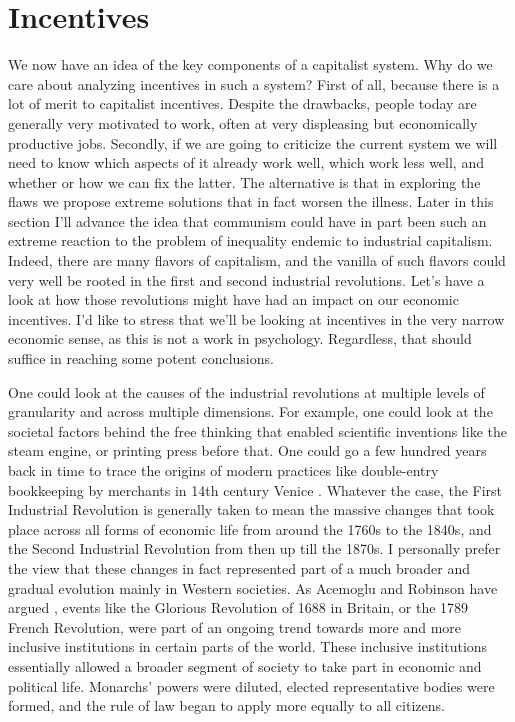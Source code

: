 \documentclass[12pt]{memoir}
\begin{document}
		\section{Incentives}
			We now have an idea of the key components of a capitalist system. Why do we care about analyzing incentives in such a system? First of all, because there is a lot of merit 
			to capitalist incentives. Despite the drawbacks, people today are generally very motivated to work, often at very displeasing but economically productive jobs. Secondly, if we are going to 
			criticize the current system we will need to know which aspects of it already work well, which work less well, and whether or how we can fix the latter. The alternative is that in exploring the flaws 
			we propose extreme solutions that in fact worsen the illness. Later in this section I'll advance the idea that communism could have in part been such an extreme reaction to the problem of inequality endemic 
			to industrial capitalism. Indeed, there are many flavors of capitalism, and the vanilla of such flavors could very well be rooted in the first and second industrial revolutions. Let's have a look at how those 
			revolutions might have had an impact on our economic incentives. I'd like to stress that we'll be looking at incentives in the very narrow economic sense, as this is not a work in psychology. Regardless, that should 
			suffice in reaching some potent conclusions.\
			
			One could look at the causes of the industrial revolutions at multiple levels of granularity and across multiple dimensions. For example, one could look at the societal factors behind the free thinking 
			that enabled scientific inventions like the steam engine, or printing press before that. One could go a few hundred years back in time to trace the origins of modern practices like double-entry 
			bookkeeping by merchants in 14th century Venice \cite{VeniceMerchants}. Whatever the case, the First Industrial Revolution is generally taken to mean the massive changes that took place
			across all forms of economic life from around the 1760s to the 1840s, and the Second Industrial Revolution from then up till the 1870s. I personally prefer the view that these changes 
			in fact represented part of a much broader and gradual evolution mainly in Western societies. As Acemoglu and Robinson have argued \cite{WhyNationsFail}, events like the Glorious Revolution of 1688
			in Britain, or the 1789 French Revolution, were part of an ongoing trend towards more and more inclusive institutions in certain parts of the world. These inclusive institutions essentially allowed a broader 
			segment of society to take part in economic and political life. Monarchs' powers were diluted, elected representative bodies were formed, and the rule of law began to apply more equally to all citizens.\
			
\end{document}
